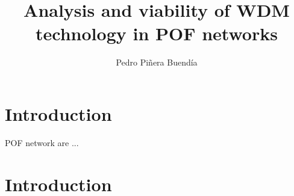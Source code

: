 \documentclass[10pt, a4paper, onecolumn, fleqn, oneside, titlepage]{article}
\title{Analysis and viability of WDM technology in POF networks}
\author{Pedro Piñera Buendía}
\begin{document}
\maketitle

\section{Introduction}
POF network are ...

\section{Introduction}
\end{document}
